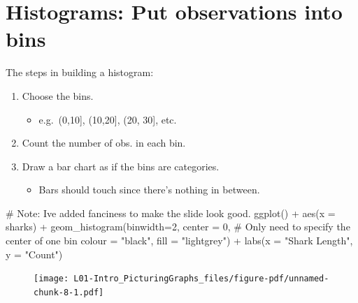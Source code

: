 \documentclass[
  letterpaper,
  DIV=11,
  numbers=noendperiod]{scrreprt}
\newenvironment{Shaded}{\begin{snugshade}}{\end{snugshade}}
\newcommand{\AttributeTok}[1]{\textcolor[rgb]{0.40,0.45,0.13}{#1}}
\newcommand{\CommentTok}[1]{\textcolor[rgb]{0.37,0.37,0.37}{#1}}
\newcommand{\DecValTok}[1]{\textcolor[rgb]{0.68,0.00,0.00}{#1}}
\newcommand{\FunctionTok}[1]{\textcolor[rgb]{0.28,0.35,0.67}{#1}}
\newcommand{\NormalTok}[1]{\textcolor[rgb]{0.00,0.23,0.31}{#1}}
\newcommand{\SpecialCharTok}[1]{\textcolor[rgb]{0.37,0.37,0.37}{#1}}
\newcommand{\StringTok}[1]{\textcolor[rgb]{0.13,0.47,0.30}{#1}}
\providecommand{\tightlist}{%
  \setlength{\itemsep}{0pt}\setlength{\parskip}{0pt}}\usepackage{longtable,booktabs,array}
\begin{document}
\hypertarget{histograms-put-observations-into-bins}{%
\section{Histograms: Put observations into
bins}\label{histograms-put-observations-into-bins}}

The steps in building a histogram:

\pspace

\begin{enumerate}
\def\labelenumi{\arabic{enumi}.}
\tightlist
\item
  Choose the bins.

  \begin{itemize}
  \tightlist
  \item
    e.g.~(0,10{]}, (10,20{]}, (20, 30{]}, etc.\lspace
  \end{itemize}
\item
  Count the number of obs. in each bin.\lspace
\item
  Draw a bar chart as if the bins are categories.

  \begin{itemize}
  \tightlist
  \item
    Bars should touch since there's nothing in between.
  \end{itemize}
\end{enumerate}

\begin{Shaded}
\begin{Highlighting}[]
\CommentTok{\# Note: I\textquotesingle{}ve added fanciness to make the slide look good.}
\FunctionTok{ggplot}\NormalTok{() }\SpecialCharTok{+} 
    \FunctionTok{aes}\NormalTok{(}\AttributeTok{x =}\NormalTok{ sharks) }\SpecialCharTok{+}
    \FunctionTok{geom\_histogram}\NormalTok{(}\AttributeTok{binwidth=}\DecValTok{2}\NormalTok{, }
        \AttributeTok{center =} \DecValTok{0}\NormalTok{, }\CommentTok{\# Only need to specify the center of one bin}
        \AttributeTok{colour =} \StringTok{"black"}\NormalTok{, }\AttributeTok{fill =} \StringTok{"lightgrey"}\NormalTok{) }\SpecialCharTok{+}
    \FunctionTok{labs}\NormalTok{(}\AttributeTok{x =} \StringTok{"Shark Length"}\NormalTok{, }\AttributeTok{y =} \StringTok{"Count"}\NormalTok{)}
\end{Highlighting}
\end{Shaded}

\begin{figure}[H]

{\centering \texttt{[image: L01-Intro\_PicturingGraphs\_files/figure-pdf/unnamed-chunk-8-1.pdf]}

}

\end{figure}
\end{document}
